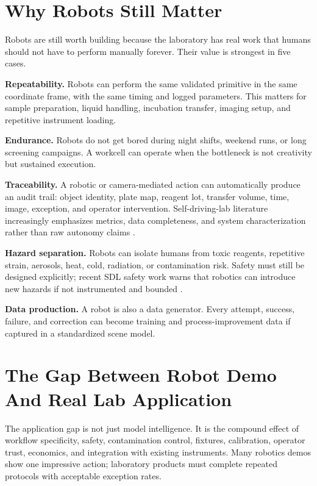 \documentclass[11pt]{article}
\begin{document}
\section{Why Robots Still Matter}

Robots are still worth building because the laboratory has real work that humans should not have to perform manually forever. Their value is strongest in five cases.

\textbf{Repeatability.} Robots can perform the same validated primitive in the same coordinate frame, with the same timing and logged parameters. This matters for sample preparation, liquid handling, incubation transfer, imaging setup, and repetitive instrument loading.

\textbf{Endurance.} Robots do not get bored during night shifts, weekend runs, or long screening campaigns. A workcell can operate when the bottleneck is not creativity but sustained execution.

\textbf{Traceability.} A robotic or camera-mediated action can automatically produce an audit trail: object identity, plate map, reagent lot, transfer volume, time, image, exception, and operator intervention. Self-driving-lab literature increasingly emphasizes metrics, data completeness, and system characterization rather than raw autonomy claims \cite{volk2024metrics}.

\textbf{Hazard separation.} Robots can isolate humans from toxic reagents, repetitive strain, aerosols, heat, cold, radiation, or contamination risk. Safety must still be designed explicitly; recent SDL safety work warns that robotics can introduce new hazards if not instrumented and bounded \cite{sdl2025safety}.

\textbf{Data production.} A robot is also a data generator. Every attempt, success, failure, and correction can become training and process-improvement data if captured in a standardized scene model.

\section{The Gap Between Robot Demo And Real Lab Application}

The application gap is not just model intelligence. It is the compound effect of workflow specificity, safety, contamination control, fixtures, calibration, operator trust, economics, and integration with existing instruments. Many robotics demos show one impressive action; laboratory products must complete repeated protocols with acceptable exception rates.
\end{document}
